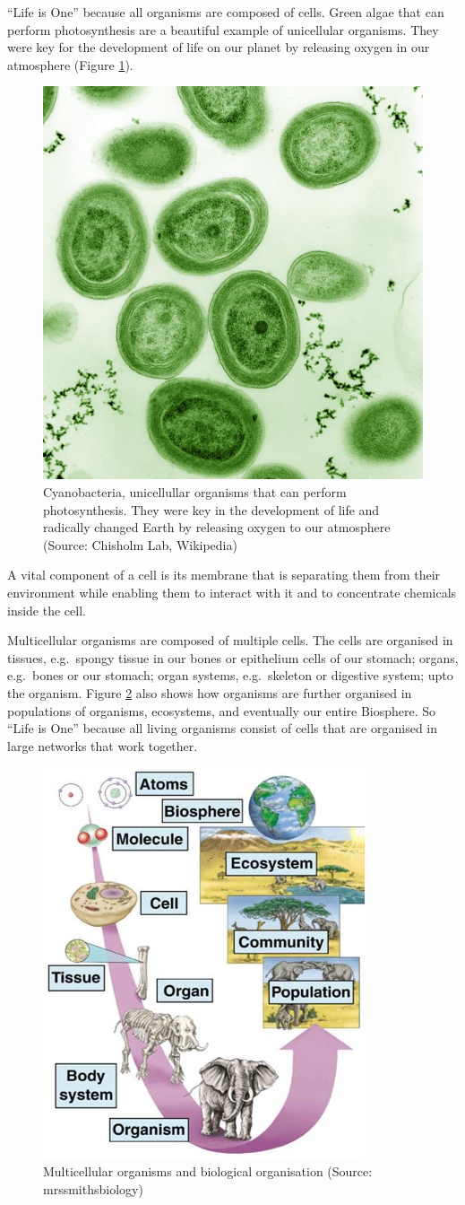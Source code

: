 \documentclass[
  11pt,
]{book}
\begin{document}
``Life is One'' because all organisms are composed of cells.
Green algae that can perform photosynthesis are a beautiful example of unicellular organisms. They were key for the development of life on our planet by releasing oxygen in our atmosphere (Figure \ref{fig:greenAlgae}).

\begin{figure}

{\centering \includegraphics[width=0.3\linewidth]{./figs/Prochlorococcus_marinus} 

}

\caption{Cyanobacteria, unicellullar organisms that can perform photosynthesis. They were key in the development of life and radically changed Earth by releasing oxygen to our atmosphere (Source: Chisholm Lab, Wikipedia)}\label{fig:greenAlgae}
\end{figure}

A vital component of a cell is its membrane that is separating them from their environment while enabling them to interact with it and to concentrate chemicals inside the cell.

Multicellular organisms are composed of multiple cells. The cells are organised in
tissues, e.g.~spongy tissue in our bones or epithelium cells of our stomach; organs, e.g.~bones or our stomach; organ systems, e.g.~skeleton or digestive system; upto the organism. Figure \ref{fig:multiCellular} also shows how organisms are further organised in populations of organisms, ecosystems, and eventually our entire Biosphere. So ``Life is One'' because all living organisms consist of cells that are organised in large networks that work together.

\begin{figure}

{\centering \includegraphics[width=0.3\linewidth]{./figs/organisationMulticellular} 

}

\caption{Multicellular organisms and biological organisation (Source: mrssmithsbiology)}\label{fig:multiCellular}
\end{figure}
\end{document}
